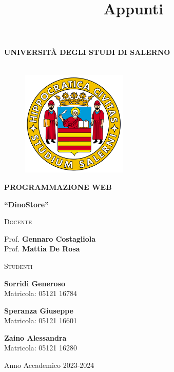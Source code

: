 \documentclass[a4paper, 11pt, oneside]{book}
\title{Appunti}
\author{}
\date{}
\begin{document}
\begin{titlepage}
    \begin{center}
        \LARGE{\uppercase{\textbf{Università degli Studi di Salerno}}}\\
        \vspace{5mm}
        \fontsize{15}{14}\\
    \end{center}
    \begin{figure}[H]
        \centering
        \includegraphics[width=0.45\textwidth]{immagini/logo_standard.png}
    \end{figure}
    
    \begin{center}
        {\LARGE{\bf PROGRAMMAZIONE WEB}}\\
        \fontsize{15}{14}
    	\vspace{5mm}
    \end{center}

    \begin{center}
        {\Large \bfseries ``DinoStore''}
    \end{center}
   
\noindent\begin{minipage}[t]{8cm}
\flushleft
\textsc{Docente}

Prof. \textbf{Gennaro Costagliola} \\
Prof. \textbf{Mattia De Rosa} \\
\end{minipage}
%
\hfill
%
\begin{minipage}[t]{6cm}
\flushright
\textsc{Studenti}

\textbf{Sorridi Generoso} \\
Matricola: 05121 16784

\textbf{Speranza Giuseppe} \\
Matricola: 05121 16601

\textbf{Zaino Alessandra} \\
Matricola: 05121 16280
\end{minipage}


    
    \vspace{15mm}
    \noindent
    
    \vspace{20mm}
    
\centering    
\normalsize Anno Accademico 2023-2024

\end{titlepage}
\end{document}
